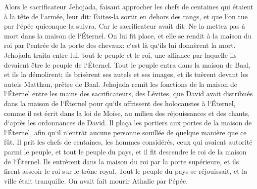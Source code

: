 \verse Alors le sacrificateur Jehojada, faisant approcher les chefs de centaines qui étaient à la tête de l`armée, leur dit: Faites-la sortir en dehors des rangs, et que l`on tue par l`épée quiconque la suivra. Car le sacrificateur avait dit: Ne la mettez pas à mort dans la maison de l`Éternel. 
\verse On lui fit place, et elle se rendit à la maison du roi par l`entrée de la porte des chevaux: c`est là qu`ils lui donnèrent la mort. 
\verse Jehojada traita entre lui, tout le peuple et le roi, une alliance par laquelle ils devaient être le peuple de l`Éternel. 
\verse Tout le peuple entra dans la maison de Baal, et ils la démolirent; ils brisèrent ses autels et ses images, et ils tuèrent devant les autels Matthan, prêtre de Baal. 
\verse Jehojada remit les fonctions de la maison de l`Éternel entre les mains des sacrificateurs, des Lévites, que David avait distribués dans la maison de l`Éternel pour qu`ils offrissent des holocaustes à l`Éternel, comme il est écrit dans la loi de Moïse, au milieu des réjouissances et des chants, d`après les ordonnances de David. 
\verse Il plaça les portiers aux portes de la maison de l`Éternel, afin qu`il n`entrât aucune personne souillée de quelque manière que ce fût. 
\verse Il prit les chefs de centaines, les hommes considérés, ceux qui avaient autorité parmi le peuple, et tout le peuple du pays, et il fit descendre le roi de la maison de l`Éternel. Ils entrèrent dans la maison du roi par la porte supérieure, et ils firent asseoir le roi sur le trône royal. 
\verse Tout le peuple du pays se réjouissait, et la ville était tranquille. On avait fait mourir Athalie par l`épée. 

\chapter{}

